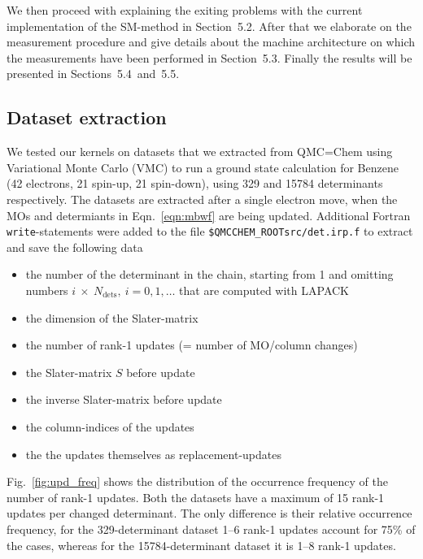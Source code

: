 \documentclass[11pt]{article}
\numberwithin{figure}{section}
\numberwithin{table}{section}
\begin{document}
    We then proceed with explaining the exiting problems with the current implementation of the SM-method in Section~5.2. After that we elaborate on the measurement procedure and give details about the machine architecture on which the measurements have been performed in Section~5.3. Finally the results will be presented in Sections~5.4~and~5.5.
    
    \subsection{Dataset extraction}
    	We tested our kernels on datasets\cite{datasets} that we extracted from QMC=Chem using Variational Monte Carlo (VMC) to run a ground state calculation for Benzene (42 electrons, 21 spin-up, 21 spin-down), using 329 and 15784 determinants respectively. The datasets are extracted after a single electron move, when the MOs and determiants in Eqn.~\ref{eqn:mbwf} are being updated. Additional Fortran \texttt{write}-statements were added to the file \texttt{\$QMCCHEM\_ROOTsrc/det.irp.f} to extract and save the following data
    	\begin{itemize}
    		\item the number of the determinant in the chain, starting from 1 and omitting numbers $i~\times~N_\mathrm{dets},~i=0,1,\ldots$ that are computed with LAPACK
    		\item the dimension of the Slater-matrix
    		\item the number of rank-1 updates (= number of MO/column changes)
    		\item the Slater-matrix $S$ before update
    		\item the inverse Slater-matrix before update
    		\item the column-indices of the updates
    		\item the the updates themselves as replacement-updates
    \end{itemize}
    
    Fig.~\ref{fig:upd_freq} shows the distribution of the occurrence frequency of the number of rank-1 updates. Both the datasets have a maximum of 15 rank-1 updates per changed determinant. The only difference is their relative occurrence frequency, for the 329-determinant dataset 1--6 rank-1 updates account for 75\% of the cases, whereas for the 15784-determinant dataset it is 1--8 rank-1 updates. 
    
\end{document}
